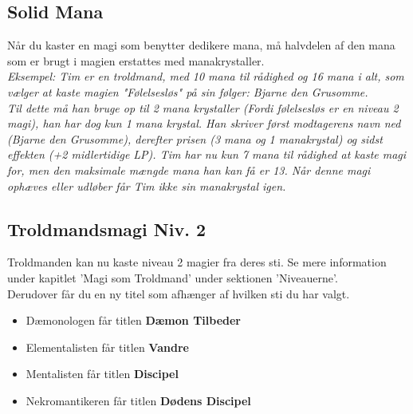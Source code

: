 \subsection{Solid Mana}
Når du kaster en magi som benytter dedikere mana, må halvdelen af den mana som er brugt i magien erstattes med manakrystaller.\\
\textit{Eksempel: Tim er en troldmand, med 10 mana til rådighed og 16 mana i alt, som vælger at kaste magien "Følelsesløs" på sin følger: Bjarne den Grusomme.\\ 
Til dette må han bruge op til 2 mana krystaller (Fordi følelsesløs er en niveau 2 magi), han har dog kun 1 mana krystal. Han skriver først modtagerens navn ned (Bjarne den Grusomme), derefter prisen (3 mana og 1 manakrystal) og sidst effekten (+2 midlertidige LP).
Tim har nu kun 7 mana til rådighed at kaste magi for, men den maksimale mængde mana han kan få er 13. Når denne magi ophæves eller udløber får Tim \emph{ikke} sin manakrystal igen.}

\subsection{Troldmandsmagi Niv. 2}
Troldmanden kan nu kaste niveau 2 magier fra deres sti. Se mere information under kapitlet 'Magi som Troldmand' under sektionen 'Niveauerne'. \\
Derudover får du en ny titel som afhænger af hvilken sti du har valgt.\\
\begin{itemize}
    \item Dæmonologen får titlen \textbf{Dæmon Tilbeder}
    \item Elementalisten får titlen \textbf{Vandre}
    \item Mentalisten får titlen \textbf{Discipel}
    \item Nekromantikeren får titlen \textbf{Dødens Discipel}
\end{itemize}